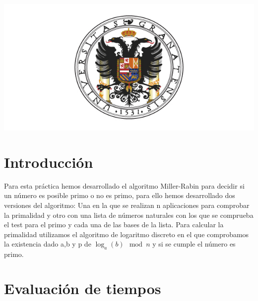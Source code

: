 \includegraphics[width=1\linewidth]{ugr}

\newpage %

\tableofcontents %



\newpage


\section*{Introducción}

Para esta práctica hemos desarrollado el algoritmo Miller-Rabin para decidir si un número es posible primo o no es primo, para ello hemos desarrollado dos versiones del algoritmo: Una en la que se realizan n aplicaciones para comprobar la primalidad y otro con una lista de números naturales con los que se comprueba el test para el primo y cada una de las bases de la lista. Para calcular la primalidad utilizamos el algoritmo de logaritmo discreto en el que comprobamos la existencia dado a,b y p de $\log_a (b) \mod n$ y si se cumple el número es primo.

\section{Evaluación de tiempos}


